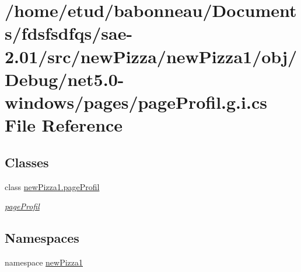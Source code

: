 \hypertarget{net5_80-windows_2pages_2pageProfil_8g_8i_8cs}{}\section{/home/etud/babonneau/\+Documents/fdsfsdfqs/sae-\/2.01/src/new\+Pizza/new\+Pizza1/obj/\+Debug/net5.0-\/windows/pages/page\+Profil.g.\+i.\+cs File Reference}
\label{net5_80-windows_2pages_2pageProfil_8g_8i_8cs}
\subsection*{Classes}
\begin{DoxyCompactItemize}
\item 
class \hyperlink{classnewPizza1_1_1pageProfil}{new\+Pizza1.\+page\+Profil}
\begin{DoxyCompactList}\small\item\em \hyperlink{classnewPizza1_1_1pageProfil}{page\+Profil} \end{DoxyCompactList}\end{DoxyCompactItemize}
\subsection*{Namespaces}
\begin{DoxyCompactItemize}
\item 
namespace \hyperlink{namespacenewPizza1}{new\+Pizza1}
\end{DoxyCompactItemize}
